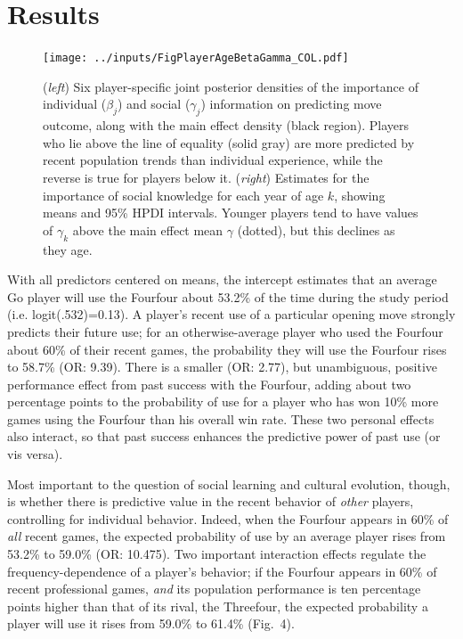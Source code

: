 \documentclass{article}
\begin{document}
\section{Results}

\begin{figure}[thp]
\begin{center} 
\texttt{[image: ../inputs/FigPlayerAgeBetaGamma\_COL.pdf]}
\caption{(\textit{left}) Six player-specific joint posterior densities of the importance of individual ($\beta_j$) and social ($\gamma_j$) information on predicting move outcome, along with the main effect density (black region).  Players who lie above the line of equality (solid gray) are more predicted by recent population trends than individual experience, while the reverse is true for players below it. (\textit{right}) Estimates for the importance of social knowledge for each year of age $k$, showing means and 95\% HPDI intervals.  Younger players tend to have values of $\gamma_k$ above the main effect mean $\gamma$ (dotted), but this declines as they age.}
\label{FigPlayerAgeBetaGamma}
\end{center}
\end{figure}

With all predictors centered on means, the intercept estimates that an average Go player will use the Fourfour about 53.2\% of the time during the study period (i.e. logit(.532)=0.13).  A player's recent use of a particular opening move strongly predicts their future use; for an otherwise-average player who used the Fourfour about 60\% of their recent games, the probability they will use the Fourfour rises to 58.7\% (OR: 9.39).  There is a smaller (OR: 2.77), but unambiguous, positive performance effect from past success with the Fourfour, adding about two percentage points to the probability of use for a player who has won 10\% more games using the Fourfour than his overall win rate.  These two personal effects also interact, so that past success enhances the predictive power of past use (or vis versa).

Most important to the question of social learning and cultural evolution, though, is whether there is predictive value in the recent behavior of \textit{other} players, controlling for individual behavior.  Indeed, when the Fourfour appears in 60\% of \textit{all} recent games, the expected probability of use by an average player rises from 53.2\% to 59.0\% (OR: 10.475).  Two important interaction effects regulate the frequency-dependence of a player's behavior; if the Fourfour appears in 60\% of recent professional games, \textit{and} its population performance is ten percentage points higher than that of its rival, the Threefour, the expected probability a player will use it rises from 59.0\% to 61.4\% (Fig.~4).
\end{document}
